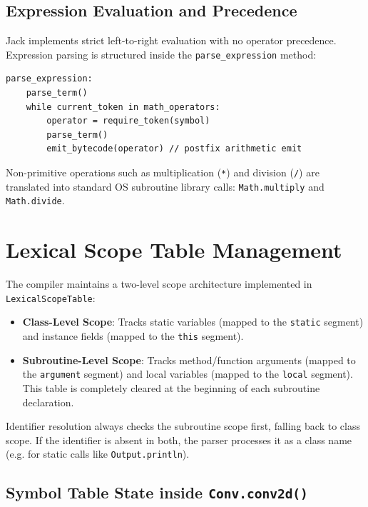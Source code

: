 \documentclass[11pt,a4paper]{article}
\begin{document}
\subsection{Expression Evaluation and Precedence}

Jack implements strict left-to-right evaluation with no operator precedence. Expression parsing is structured inside the \texttt{parse_expression} method:

\begin{lstlisting}[style=pseudocode, caption={Syntactic Parsing of Expressions}]
parse_expression:
    parse_term()
    while current_token in math_operators:
        operator = require_token(symbol)
        parse_term()
        emit_bytecode(operator) // postfix arithmetic emit
\end{lstlisting}

Non-primitive operations such as multiplication (\texttt{*}) and division (\texttt{/}) are translated into standard OS subroutine library calls: \texttt{Math.multiply} and \texttt{Math.divide}.

\section{Lexical Scope Table Management}

The compiler maintains a two-level scope architecture implemented in \texttt{LexicalScopeTable}:
\begin{itemize}
    \item \textbf{Class-Level Scope}: Tracks static variables (mapped to the \texttt{static} segment) and instance fields (mapped to the \texttt{this} segment).
    \item \textbf{Subroutine-Level Scope}: Tracks method/function arguments (mapped to the \texttt{argument} segment) and local variables (mapped to the \texttt{local} segment). This table is completely cleared at the beginning of each subroutine declaration.
\end{itemize}

Identifier resolution always checks the subroutine scope first, falling back to class scope. If the identifier is absent in both, the parser processes it as a class name (e.g. for static calls like \texttt{Output.println}).

\subsection{Symbol Table State inside \texttt{Conv.conv2d()}}
\end{document}
